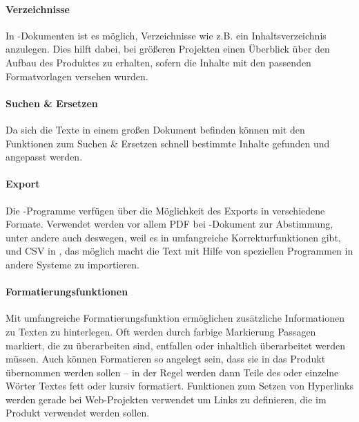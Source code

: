 \paragraph{Verzeichnisse} In -Dokumenten ist es möglich, Verzeichnisse wie z.B. ein Inhaltsverzeichnis anzulegen. Dies hilft dabei, bei größeren Projekten einen Überblick über den Aufbau des Produktes zu erhalten, sofern die Inhalte mit den passenden Formatvorlagen versehen wurden.

\paragraph{Suchen \& Ersetzen} Da sich die Texte in einem großen Dokument befinden können mit den Funktionen zum Suchen \& Ersetzen schnell bestimmte Inhalte gefunden und angepasst werden.

\paragraph{Export} Die -Programme verfügen über die Möglichkeit des Exports in verschiedene Formate. Verwendet werden vor allem PDF bei -Dokument zur Abstimmung, unter andere auch deswegen, weil es in   umfangreiche Korrekturfunktionen gibt, und CSV in , das möglich macht die Text mit Hilfe von speziellen Programmen in andere Systeme zu importieren.

\paragraph{Formatierungsfunktionen} Mit umfangreiche Formatierungsfunktion ermöglichen zusätzliche Informationen zu Texten zu hinterlegen. Oft werden durch farbige Markierung Passagen markiert, die zu überarbeiten sind, entfallen oder inhaltlich überarbeitet werden müssen. Auch können Formatieren so angelegt sein, dass sie in das Produkt übernommen werden sollen -- in der Regel werden dann Teile des oder einzelne Wörter Textes fett oder kursiv formatiert. Funktionen zum Setzen von Hyperlinks werden gerade bei Web-Projekten verwendet um Links zu definieren, die im Produkt verwendet werden sollen.

\bigskip

